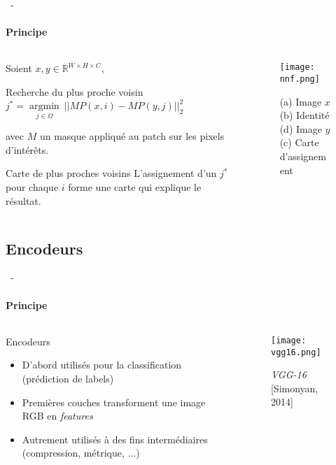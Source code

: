 \documentclass[aspectratio=169, 22pt]{beamer}
\DeclareMathOperator*{\argmin}{argmin}
\begin{document}
\begin{frame}{\secname~- \subsecname} 
  \framesubtitle{Principe}
  \begin{columns}
    \begin{column}{0.6\linewidth}
      Soient $x, y \in \mathbb{R}^{W \times H \times C}$,
      \begin{block}{Recherche du plus proche voisin}
        \centering
        $j^* = \underset{j \in \Omega}{\argmin}\ ||MP(x,i) - MP(y,j)||_2^2$
      \end{block}
      {\small avec $M$ un masque appliqué au patch sur les pixels d'intérêts.}
      
      \pause
      \begin{exampleblock}{Carte de plus proches voisins}
        \centering
        L'assignement d'un $j^*$ pour chaque $i$ forme une carte qui \alert{explique} le résultat.
      \end{exampleblock}
    \end{column}
    \begin{column}{0.4\linewidth}
      \begin{figure}
        \centering
        \texttt{[image: nnf.png]}
        \caption{(a) Image $x$ (b) Identité \\ (d) Image $y$ (c) Carte d'assignement}
      \end{figure}
    \end{column}
  \end{columns}
\end{frame}

\subsection{Encodeurs}
\begin{frame}{\secname~- \subsecname}
  \framesubtitle{Principe}
  \begin{columns}
    \begin{column}{0.4\linewidth}
      \begin{block}{Encodeurs}
        \begin{itemize}
        \item D'abord utilisés pour la classification (prédiction de labels)
        \item Premières couches transforment une image RGB en \alert{\emph{features}}
        \item Autrement utilisés à des fins intermédiaires (compression, métrique, ...)
        \end{itemize}
      \end{block}
    \end{column}
    \begin{column}{0.6\linewidth}
      \begin{figure}
        \centering
        \texttt{[image: vgg16.png]}
        \caption{\emph{VGG-16} [Simonyan, 2014]}
      \end{figure}
    \end{column}
  \end{columns}
\end{frame}
\end{document}
